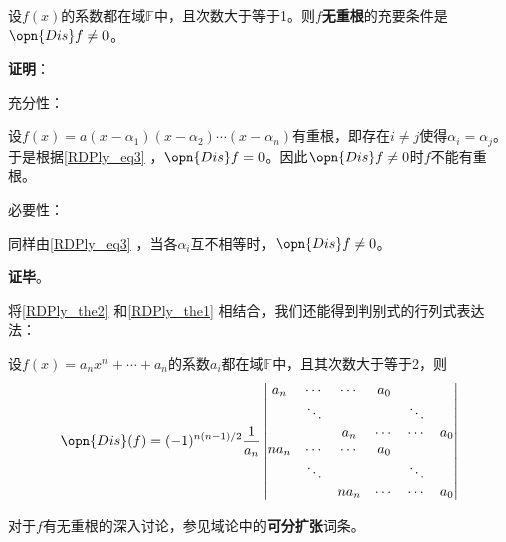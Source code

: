\begin{theorem}{}\label{RDPly_the1}
设$f(x)$的系数都在域$\mathbb{F}$中，且次数大于等于1。则$f$\textbf{无重根}的充要条件是$\opn{Dis}f\neq 0$。
\end{theorem}

\textbf{证明}：

充分性：

设$f(x)=a(x-\alpha_1)(x-\alpha_2)\cdots(x-\alpha_n)$有重根，即存在$i\neq j$使得$\alpha_i=\alpha_j$。于是根据\autoref{RDPly_eq3} ，$\opn{Dis}f = 0$。因此$\opn{Dis}f\neq 0$时$f$不能有重根。

必要性：

同样由\autoref{RDPly_eq3} ，当各$\alpha_i$互不相等时，$\opn{Dis}f\neq 0$。

\textbf{证毕}。


将\autoref{RDPly_the2} 和\autoref{RDPly_the1} 相结合，我们还能得到判别式的行列式表达法：

\begin{theorem}{}
设$f(x)=a_nx^n+\cdots+a_n$的系数$a_i$都在域$\mathbb{F}$中，且其次数大于等于2，则
\begin{equation}
\opn{Dis}(f) = (-1)^{n(n-1)/2}\frac{1}{a_n}
\begin{vmatrix}
a_n&\cdots&\cdots&a_0\\
&\ddots&&&\ddots\\
&&a_n&\cdots&\cdots&a_0\\
na_n&\cdots&\cdots&a_0\\
&\ddots&&&\ddots\\
&&na_n&\cdots&\cdots&a_0
\end{vmatrix}
\end{equation}
\end{theorem}

对于$f$有无重根的深入讨论，参见域论中的\textbf{可分扩张}词条。









